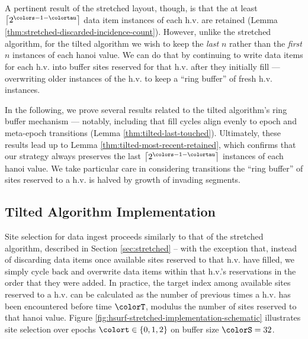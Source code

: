 A pertinent result of the stretched layout, though, is that the at least $\left\lceil2^{\colors - 1 - \colortau}\right\rceil$ data item instances of each h.v. are retained (Lemma \ref{thm:stretched-discarded-incidence-count}).
However, unlike the stretched algorithm, for the tilted algorithm we wish to keep the \textit{last} $n$ rather than the \textit{first} $n$ instances of each hanoi value.
We can do that by continuing to write data items for each h.v. into buffer sites reserved for that h.v. after they initially fill --- overwriting older instances of the h.v. to keep a ``ring buffer'' of fresh h.v. instances.

In the following, we prove several results related to the tilted algorithm's ring buffer mechanism --- notably, including that fill cycles align evenly to epoch and meta-epoch transitions (Lemma \ref{thm:tilted-last-touched}).
Ultimately, these results lead up to Lemma \ref{thm:tilted-most-recent-retained}, which confirms that our strategy always preserves the last $\left\lceil 2^{\colors - 1 - \colortau} \right\rceil$ instances of each hanoi value.
We take particular care in considering transitions the ``ring buffer'' of sites reserved to a h.v. is halved by growth of invading segments.











\subsection{Tilted Algorithm Implementation}
\label{sec:tilted-implementation}



Site selection for data ingest proceeds similarly to that of the stretched algorithm, described in Section \ref{sec:stretched} -- with the exception that, instead of discarding data items once available sites reserved to that h.v. have filled, we simply cycle back and overwrite data items within that h.v.'s reservations in the order that they were added.
In practice, the target index among available sites reserved to a h.v. can be calculated as the number of previous times a h.v. has been encountered before time $\colorT$, modulus the number of sites reserved to that hanoi value.
Figure \ref{fig:hsurf-stretched-implementation-schematic} illustrates site selection over epochs $\colort \in \{0,1,2\}$ on buffer size $\colorS=32$.

